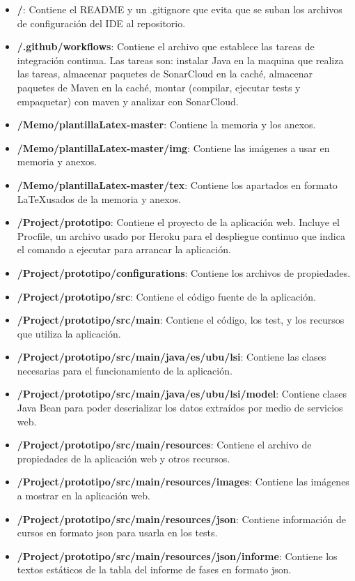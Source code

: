 \begin{itemize}
	\item \textbf{/}: Contiene el README y un .gitignore que evita que se suban los archivos de configuración del IDE al repositorio.
	\item \textbf{/.github/workflows}: Contiene el archivo que establece las tareas de integración continua.
	Las tareas son: instalar Java en la maquina que realiza las tareas, almacenar paquetes de SonarCloud en la caché, almacenar paquetes de Maven en la caché, montar (compilar, ejecutar tests y empaquetar) con maven y analizar con SonarCloud.
	\item \textbf{/Memo/plantillaLatex-master}: Contiene la memoria y los anexos.
	\item \textbf{/Memo/plantillaLatex-master/img}: Contiene las imágenes a usar en memoria y anexos.
	\item \textbf{/Memo/plantillaLatex-master/tex}: Contiene los apartados en formato \LaTeX usados de la memoria y anexos.
	\item \textbf{/Project/prototipo}: Contiene el proyecto de la aplicación web. Incluye el Procfile, un archivo usado por Heroku para el despliegue continuo que indica el comando a ejecutar para arrancar la aplicación.
	\item \textbf{/Project/prototipo/configurations}: Contiene los archivos de propiedades.
	\item \textbf{/Project/prototipo/src}: Contiene el código fuente de la aplicación.
	\item \textbf{/Project/prototipo/src/main}: Contiene el código, los test, y los recursos que utiliza la aplicación.
	\item \textbf{/Project/prototipo/src/main/java/es/ubu/lsi}: Contiene las clases necesarias para el funcionamiento de la aplicación.
	\item \textbf{/Project/prototipo/src/main/java/es/ubu/lsi/model}: Contiene clases Java Bean para poder deserializar los datos extraídos por medio de servicios web.
	\item \textbf{/Project/prototipo/src/main/resources}: Contiene el archivo de propiedades de la aplicación web y otros recursos.
	\item \textbf{/Project/prototipo/src/main/resources/images}: Contiene las imágenes a mostrar en la aplicación web.
	\item \textbf{/Project/prototipo/src/main/resources/json}: Contiene información de cursos en formato json para usarla en los tests.
	\item \textbf{/Project/prototipo/src/main/resources/json/informe}: Contiene los textos estáticos de la tabla del informe de fases en formato json.

\end{itemize}
